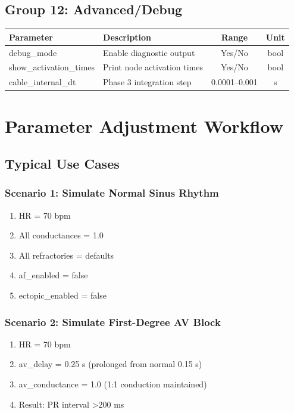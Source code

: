 \documentclass[11pt, a4paper]{article}
\begin{document}
\subsection{Group 12: Advanced/Debug}

\begin{tabularx}{\textwidth}{|l|X|c|c|}
\hline
\textbf{Parameter} & \textbf{Description} & \textbf{Range} & \textbf{Unit} \\
\hline
debug\_mode & Enable diagnostic output & Yes/No & bool \\
show\_activation\_times & Print node activation times & Yes/No & bool \\
cable\_internal\_dt & Phase 3 integration step & 0.0001--0.001 & s \\
\hline
\end{tabularx}

\section{Parameter Adjustment Workflow}

\subsection{Typical Use Cases}

\subsubsection{Scenario 1: Simulate Normal Sinus Rhythm}
\begin{enumerate}
    \item HR = 70 bpm
    \item All conductances = 1.0
    \item All refractories = defaults
    \item af\_enabled = false
    \item ectopic\_enabled = false
\end{enumerate}

\subsubsection{Scenario 2: Simulate First-Degree AV Block}
\begin{enumerate}
    \item HR = 70 bpm
    \item av\_delay = 0.25 s (prolonged from normal 0.15 s)
    \item av\_conductance = 1.0 (1:1 conduction maintained)
    \item Result: PR interval >200 ms
\end{enumerate}
\end{document}
